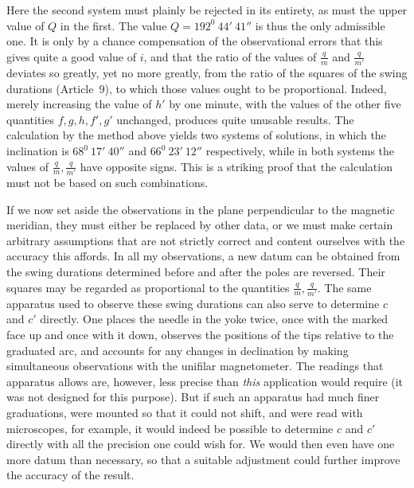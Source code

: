 Here the second system must plainly be rejected in its entirety, as must the upper value of $Q$ in the first. The value $Q=192^0\ 44'\ 41''$ is thus the only admissible one. It is only by a chance compensation of the observational errors that this gives quite a good value of $i$, and that the ratio of the values of $\frac{q}{m}$ and $\frac{q}{m'}$ deviates so greatly, yet no more greatly, from the ratio of the squares of the swing durations (Article\ 9), to which those values ought to be proportional. Indeed, merely increasing the value of $h'$ by one minute, with the values
of the other five quantities $f,g,h,f',g'$ unchanged, produces quite unusable results. The calculation by the method above yields two systems of solutions, in which the inclination is $68^0\ 17'\ 40''$ and $66^0\ 23'\ 12''$ respectively, while in both systems the values of $\frac{q}{m},\frac{q}{m'}$ have opposite signs. This is a striking proof that the calculation must not be based on such combinations.

If we now set aside the observations in the plane perpendicular to the magnetic meridian, they must either be replaced by other data, or we must make certain arbitrary assumptions that are not strictly correct and content ourselves with the accuracy this affords. In all my observations, a new datum can be obtained from the swing durations determined before and after the poles are reversed. Their squares may be regarded as proportional to the quantities $\frac{q}{m},\frac{q}{m'}$. The same apparatus used to observe these swing durations can also serve to determine $c$ and $c'$ directly. One places the needle in the yoke twice, once with the marked face up and once with it down, observes the positions of the tips relative to the graduated arc, and accounts for any changes in declination by making simultaneous observations with the unifilar magnetometer. The readings that apparatus allows are, however, less precise than \textit{this} application would require (it was not designed for this purpose). But if such an apparatus had much finer graduations, were mounted so that it could not shift, and were read with microscopes, for example, it would indeed be possible to determine $c$ and $c'$ directly with all the precision one could wish for. We would then even have one more datum than necessary, so that a suitable adjustment could further improve the accuracy of the result.

